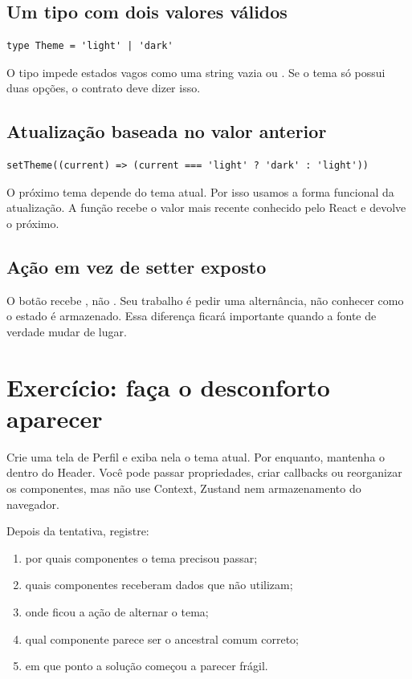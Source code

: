 \subsection{Um tipo com dois valores válidos}

\begin{lstlisting}
type Theme = 'light' | 'dark'
\end{lstlisting}

O tipo impede estados vagos como uma string vazia ou . Se o tema
só possui duas opções, o contrato deve dizer isso.

\subsection{Atualização baseada no valor anterior}

\begin{lstlisting}
setTheme((current) => (current === 'light' ? 'dark' : 'light'))
\end{lstlisting}

O próximo tema depende do tema atual. Por isso usamos a forma funcional da
atualização. A função recebe o valor mais recente conhecido pelo React e devolve
o próximo.

\subsection{Ação em vez de setter exposto}

O botão recebe , não . Seu trabalho é pedir
uma alternância, não conhecer como o estado é armazenado. Essa diferença ficará
importante quando a fonte de verdade mudar de lugar.

\section{Exercício: faça o desconforto aparecer}

\begin{tarefa}
Crie uma tela de Perfil e exiba nela o tema atual. Por enquanto, mantenha o
 dentro do Header. Você pode passar propriedades, criar
callbacks ou reorganizar os componentes, mas não use Context, Zustand nem
armazenamento do navegador.
\end{tarefa}

Depois da tentativa, registre:

\begin{enumerate}
  \item por quais componentes o tema precisou passar;
  \item quais componentes receberam dados que não utilizam;
  \item onde ficou a ação de alternar o tema;
  \item qual componente parece ser o ancestral comum correto;
  \item em que ponto a solução começou a parecer frágil.
\end{enumerate}

